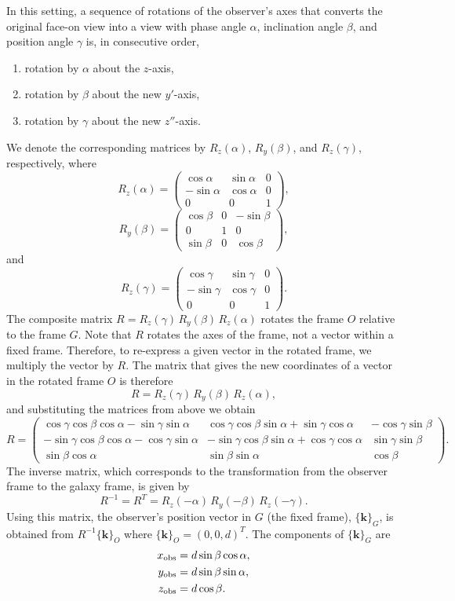 \documentclass[english,a4paper]{my_memo}
\begin{document}
In this setting, a sequence of rotations of the observer's axes
that converts the original face-on view into a view with phase
angle $\alpha$, inclination angle $\beta$, and position angle
$\gamma$ is, in consecutive order,
\begin{enumerate}
\item rotation by $\alpha$ about the $z$-axis,
\item rotation by $\beta$ about the new $y'$-axis,
\item rotation by $\gamma$ about the new $z''$-axis.
\end{enumerate}
We denote the corresponding matrices by $R_{z}(\alpha)$,
$R_{y}(\beta)$, and $R_{z}(\gamma)$, respectively, where
\[
R_{z}(\alpha)=\left(\begin{array}{ccc}
\cos\alpha & \sin\alpha & 0\\
-\sin\alpha & \cos\alpha & 0\\
0 & 0 & 1
\end{array}\right),
\]
\[
R_{y}(\beta)=\left(\begin{array}{ccc}
\cos\beta & 0 & -\sin\beta\\
0 & 1 & 0\\
\sin\beta & 0 & \cos\beta
\end{array}\right),
\]
and
\[
R_{z}(\gamma)=\left(\begin{array}{ccc}
\cos\gamma & \sin\gamma & 0\\
-\sin\gamma & \cos\gamma & 0\\
0 & 0 & 1
\end{array}\right).
\]
The composite matrix
$R = R_{z}(\gamma)\,R_{y}(\beta)\,R_{z}(\alpha)$ rotates the frame
$O$ relative to the frame $G$. Note that $R$ rotates the axes of
the frame, not a vector within a fixed frame. Therefore, to
re-express a given vector in the rotated frame, we multiply the
vector by $R$. The matrix that gives the new coordinates of a
vector in the rotated frame $O$ is therefore
\[
R = R_{z}(\gamma)\,R_{y}(\beta)\,R_{z}(\alpha),
\]
and substituting the matrices from above we obtain
\[
R=\left(\begin{array}{ccc}
\cos\gamma\cos\beta\cos\alpha-\sin\gamma\sin\alpha & \cos\gamma\cos\beta\sin\alpha+\sin\gamma\cos\alpha & -\cos\gamma\sin\beta\\
-\sin\gamma\cos\beta\cos\alpha-\cos\gamma\sin\alpha & -\sin\gamma\cos\beta\sin\alpha+\cos\gamma\cos\alpha & \sin\gamma\sin\beta\\
\sin\beta\cos\alpha & \sin\beta\sin\alpha & \cos\beta
\end{array}\right).
\]
The inverse matrix, which corresponds to the transformation from
the observer frame to the galaxy frame, is given by
\[
R^{-1}=R^{T}=R_{z}(-\alpha)\,R_{y}(-\beta)\,R_{z}(-\gamma).
\]
Using this matrix, the observer's position vector in $G$ (the fixed
frame), $\{\mathbf{k}\}_{G}$, is obtained from
$R^{-1}\{\mathbf{k}\}_{O}$ where $\{\mathbf{k}\}_{O}=(0,0,d)^{T}$.
The components of $\{\mathbf{k}\}_{G}$ are
\begin{align*}
x_{\rm obs} & = d\sin\beta\cos\alpha,\\
y_{\rm obs} & = d\sin\beta\sin\alpha,\\
z_{\rm obs} & = d\cos\beta.
\end{align*}
\end{document}
